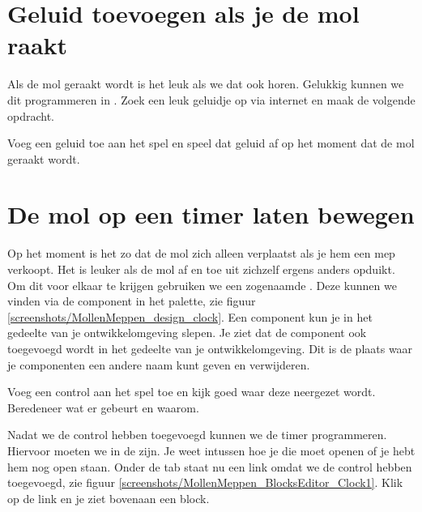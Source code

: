 \section{Geluid toevoegen als je de mol raakt}
Als de mol geraakt wordt is het leuk als we dat ook horen. Gelukkig kunnen we dit programmeren in \ai. 
Zoek een leuk geluidje op via internet en maak de volgende opdracht.
 
\begin{opgave}
    \opgVraag
	Voeg een geluid toe aan het spel en speel dat geluid af op het moment dat de mol geraakt wordt. 
\end{opgave}

\section{De mol op een timer laten bewegen}
Op het moment is het zo dat de mol zich alleen verplaatst als je hem een mep verkoopt. Het is leuker als de mol af en toe uit zichzelf ergens anders opduikt. Om dit voor elkaar te krijgen gebruiken we een zogenaamde . 
Deze kunnen we vinden via de  component in het  palette, zie figuur \ref{screenshots/MollenMeppen_design_clock}. 
Een component kun je in het  gedeelte van je ontwikkelomgeving slepen. 
Je ziet dat de component ook toegevoegd wordt in het  gedeelte van je ontwikkelomgeving. 
Dit is de plaats waar je componenten een andere naam kunt geven en verwijderen.
 
 
\begin{opgave}
    \opgVraag
	Voeg een  control aan het spel toe en kijk goed waar deze neergezet wordt. Beredeneer wat er gebeurt en waarom. 
\end{opgave}

Nadat we de  control hebben toegevoegd kunnen we de timer programmeren. Hiervoor moeten we in de  zijn. Je weet intussen hoe je die moet openen of je hebt hem nog open staan. 
Onder de  tab staat nu een  link omdat we 
de  control hebben toegevoegd, zie figuur \ref{screenshots/MollenMeppen_BlocksEditor_Clock1}. Klik op de link en je ziet bovenaan 
een  block.

 
